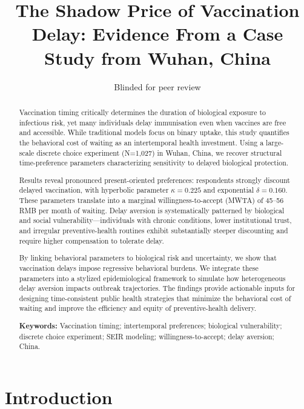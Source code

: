 \documentclass[12pt]{article}
\begin{document}
\title{The Shadow Price of Vaccination Delay: Evidence From a Case Study from Wuhan, China}

\author{Blinded for peer review}
\maketitle

\begin{abstract}
Vaccination timing critically determines the duration of biological exposure to infectious 
risk, yet many individuals delay immunisation even when vaccines are free and accessible. 
While traditional models focus on binary uptake, this study quantifies the behavioral cost 
of waiting as an intertemporal health investment. Using a large-scale discrete choice 
experiment (N=1,027) in Wuhan, China, we recover structural time-preference parameters 
characterizing sensitivity to delayed biological protection.

Results reveal pronounced present-oriented preferences: respondents strongly discount 
delayed vaccination, with hyperbolic parameter $\kappa = 0.225$ and exponential 
$\delta = 0.160$. These parameters translate into a marginal willingness-to-accept (MWTA) 
of 45--56 RMB per month of waiting. Delay aversion is systematically patterned by 
biological and social vulnerability—individuals with chronic conditions, lower 
institutional trust, and irregular preventive-health routines exhibit substantially 
steeper discounting and require higher compensation to tolerate delay.

By linking behavioral parameters to biological risk and uncertainty, we show that 
vaccination delays impose regressive behavioral burdens. We integrate these parameters 
into a stylized epidemiological framework to simulate how heterogeneous delay aversion 
impacts outbreak trajectories. The findings provide actionable inputs for designing 
time-consistent public health strategies that minimize the behavioral cost of waiting and 
improve the efficiency and equity of preventive-health delivery.

\textbf{Keywords:} Vaccination timing; intertemporal preferences; biological vulnerability; 
discrete choice experiment; SEIR modeling; willingness-to-accept; delay aversion; China.
\end{abstract}




\section{Introduction}
\doublespacing
\end{document}
